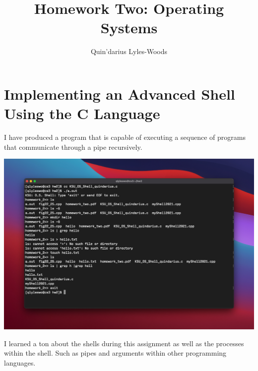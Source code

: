 \documentclass{article}
\title{Homework Two: Operating Systems}
\author{Quin'darius Lyles-Woods}
\begin{document}
\maketitle
\section*{Implementing an Advanced Shell Using the C Language}
I have produced a program that is capable of executing a sequence of programs that communicate through a pipe recursively.
\begin{center}
\includegraphics[width=\textwidth]{homework_two_screenshot}
\end{center}

I learned a ton about the shells during this assignment as well as the processes within the shell. Such as pipes and arguments within other programming languages.
\end{document}
